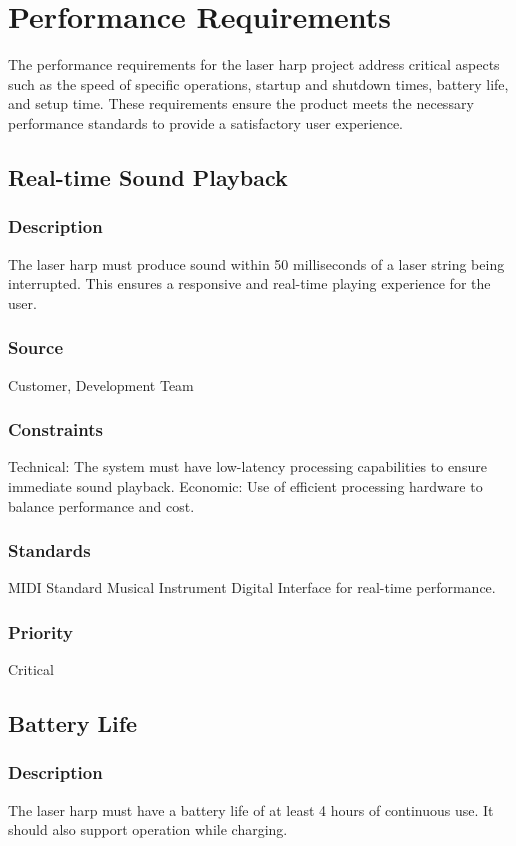 \section{Performance Requirements}

The performance requirements for the laser harp project address critical aspects such as the speed of specific operations, startup and shutdown times, battery life, and setup time. These requirements ensure the product meets the necessary performance standards to provide a satisfactory user experience.

\subsection{Real-time Sound Playback}
\subsubsection{Description}
The laser harp must produce sound within 50 milliseconds of a laser string being interrupted. This ensures a responsive and real-time playing experience for the user.
\subsubsection{Source}
Customer, Development Team
\subsubsection{Constraints}
Technical: The system must have low-latency processing capabilities to ensure immediate sound playback.
Economic: Use of efficient processing hardware to balance performance and cost.
\subsubsection{Standards}
MIDI Standard Musical Instrument Digital Interface for real-time performance.
\subsubsection{Priority}
Critical


\subsection{Battery Life}
\subsubsection{Description}
The laser harp must have a battery life of at least 4 hours of continuous use. It should also support operation while charging.
